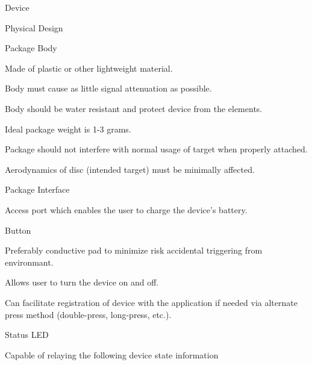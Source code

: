 \documentclass[12pt]{article}
\begin{document}
  \begin{packed_enum}
    \item Device
    \begin{packed_enum}
      \item Physical Design
      \begin{packed_enum}
        \item Package Body
        \begin{packed_enum}
          \item Made of plastic or other lightweight material.
          \item Body must cause as little signal attenuation as possible.
          \item Body should be water resistant and protect device from the
                elements.
          \item Ideal package weight is 1-3 grams.
          \item Package should not interfere with normal usage of target when
                properly attached.
          \begin{packed_enum}
            \item Aerodynamics of disc (intended target) must be minimally
                  affected.
          \end{packed_enum}
        \end{packed_enum}
        \item Package Interface
        \begin{packed_enum}
          \item Access port which enables the user to charge the device's
                battery.
          \item Button
          \begin{packed_enum}
            \item Preferably conductive pad to minimize risk accidental
                  triggering from environmant.
            \item Allows user to turn the device on and off.
            \item Can facilitate registration of device with the application if
                  needed via alternate press method (double-press, long-press,
                  etc.).
          \end{packed_enum}
          \item Status LED
          \begin{packed_enum}
            \item Capable of relaying the following device state information

\end{packed_enum}
\end{packed_enum}
\end{packed_enum}
\end{packed_enum}
\end{packed_enum}
\end{document}
